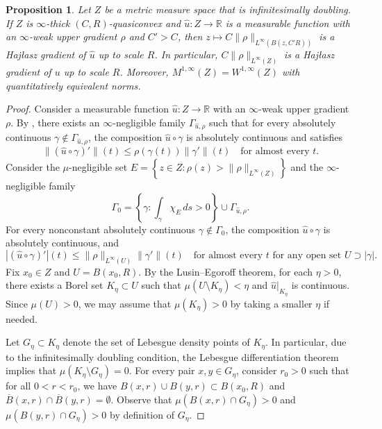 \documentclass[reqno]{amsart}
\numberwithin{equation}{section}
\newtheorem{proposition}[theorem]{Proposition}
\theoremstyle{remark}
\begin{document}
\begin{proposition}\label{prop:thick:to:Hajlasz}
Let $Z$ be a metric measure space that is infinitesimally doubling. If $Z$ is $\infty$-thick $(C,R)$-quasiconvex and $\widehat{u} \colon Z \to \mathbb{R}$ is a measurable function with an $\infty$-weak upper gradient $\rho$ and $C' > C$, then $z \mapsto C\| \rho \|_{ L^{\infty}( B( z, C'R) ) }$ is a Haj{\l}asz gradient of $\widehat{u}$ up to scale $R$. In particular, $C\|\rho\|_{ L^{\infty}( Z ) }$ is a Haj{\l}asz gradient of $u$ up to scale $R$. Moreover, $M^{1,\infty}(Z)=W^{1,\infty}(Z)$ with quantitatively equivalent norms.
\end{proposition}
\begin{proof}

Consider a measurable function $\widehat{u} \colon Z \to \mathbb{R}$ with an $\infty$-weak upper gradient $\rho$. By , there exists an $\infty$-negligible family $\Gamma_{ \widehat{u}, \rho }$ such that for every absolutely continuous $\gamma \not\in \Gamma_{ \widehat{u}, \rho }$, the composition $\widehat u \circ \gamma$ is absolutely continuous and satisfies
\begin{equation*}
    \| ( \widehat{u} \circ \gamma )' \|(t)
    \leq 
    \rho( \gamma(t) ) \| \gamma' \|(t)
    \quad\text{for almost every $t$.}
\end{equation*}
Consider the $\mu$-negligible set $E = \left\{z\in Z \colon\rho(z) > \| \rho \|_{L^\infty(Z)} \right\}$ and the $\infty$-negligible family 
$$\Gamma_0 = \left\{ \gamma \colon \int_{\gamma} \chi_{E} \,ds > 0 \right\} \cup \Gamma_{ \widehat{u}, \rho }.$$
For every nonconstant absolutely continuous $\gamma \not\in \Gamma_{0}$, the composition $\widehat u\circ \gamma$ is absolutely continuous, and
\begin{equation}\label{eq:p-thick-quasiconvexity}
    | ( \widehat{u} \circ \gamma )' |(t)
    \leq
    \|\rho\|_{ L^\infty(U) } \| \gamma' \|(t)
    \quad\text{for almost every $t$ for any open set $U \supset |\gamma|$.}
\end{equation}
Fix $x_{0} \in Z$ and $U = B( x_0, R )$. By the Lusin–Egoroff theorem, for each $\eta > 0$, there exists a Borel set $K_{\eta} \subset U$ such that $\mu( U \setminus K_\eta ) < \eta$ and $\widehat u|_{ K_\eta }$ is continuous. Since $\mu( U ) > 0$, we may assume that $\mu( K_{\eta} ) > 0$ by taking a smaller $\eta$ if needed.

Let $G_{ \eta } \subset K_{\eta}$ denote the set of Lebesgue density points of $K_\eta$. In particular, due to the infinitesimally doubling condition, the Lebesgue differentiation theorem implies that $\mu (K_{\eta}\setminus G_{\eta})=0$. For every pair $x,y \in G_{\eta}$, consider $r_0 > 0$ such that for all $0 < r< r_0$, we have $B( x, r )\cup B(y,r) \subset B( x_0, R )$ and $\overline{B}( x, r ) \cap \overline{B}( y, r ) = \emptyset$. Observe that $\mu( B( x, r ) \cap G_\eta ) > 0$ and $\mu( B( y, r ) \cap G_\eta ) > 0$ by definition of $G_\eta$.


\end{proof}
\end{document}
